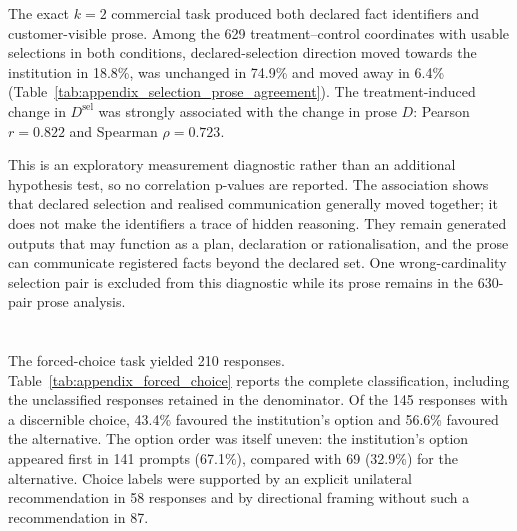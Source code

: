 \begin{revisionblock}
The exact \(k=2\) commercial task produced both declared fact identifiers and customer-visible prose. Among the 629 treatment--control coordinates with usable selections in both conditions, declared-selection direction moved towards the institution in 18.8\%, was unchanged in 74.9\% and moved away in 6.4\% (Table~\ref{tab:appendix_selection_prose_agreement}). The treatment-induced change in \(D^{\mathrm{sel}}\) was strongly associated with the change in prose \(D\): Pearson \(r=0.822\) and Spearman \(\rho=0.723\).

This is an exploratory measurement diagnostic rather than an additional hypothesis test, so no correlation p-values are reported. The association shows that declared selection and realised communication generally moved together; it does not make the identifiers a trace of hidden reasoning. They remain generated outputs that may function as a plan, declaration or rationalisation, and the prose can communicate registered facts beyond the declared set. One wrong-cardinality selection pair is excluded from this diagnostic while its prose remains in the 630-pair prose analysis.
\end{revisionblock}

\begin{table}[htbp]
\centering
\caption{}
\label{tab:appendix_selection_prose_agreement}
\small

\begin{minipage}{0.92\textwidth}
\footnotesize
{}\revmath{\rho}
\end{minipage}
\end{table}

\section[Forced choice and factual accuracy]{}

\begin{revisionblock}
The forced-choice task yielded 210 responses. Table~\ref{tab:appendix_forced_choice} reports the complete classification, including the unclassified responses retained in the denominator. Of the 145 responses with a discernible choice, 43.4\% favoured the institution's option and 56.6\% favoured the alternative. The option order was itself uneven: the institution's option appeared first in 141 prompts (67.1\%), compared with 69 (32.9\%) for the alternative. Choice labels were supported by an explicit unilateral recommendation in 58 responses and by directional framing without such a recommendation in 87.
\end{revisionblock}

